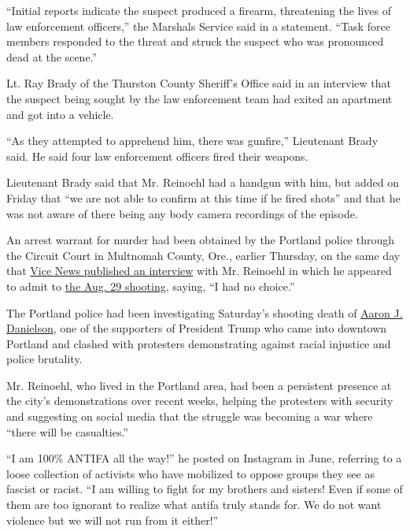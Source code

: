 ``Initial reports indicate the suspect produced a firearm, threatening
the lives of law enforcement officers,'' the Marshals Service said in a
statement. ``Task force members responded to the threat and struck the
suspect who was pronounced dead at the scene.''

Lt. Ray Brady of the Thurston County Sheriff's Office said in an
interview that the suspect being sought by the law enforcement team had
exited an apartment and got into a vehicle.

``As they attempted to apprehend him, there was gunfire,'' Lieutenant
Brady said. He said four law enforcement officers fired their weapons.

Lieutenant Brady said that Mr. Reinoehl had a handgun with him, but
added on Friday that ``we are not able to confirm at this time if he
fired shots'' and that he was not aware of there being any body camera
recordings of the episode.

An arrest warrant for murder had been obtained by the Portland police
through the Circuit Court in Multnomah County, Ore., earlier Thursday,
on the same day that
\href{https://www.vice.com/en_us/article/v7g8vb/man-linked-to-killing-at-a-portland-protest-says-he-acted-in-self-defense}{Vice
News published an interview} with Mr. Reinoehl in which he appeared to
admit to
\href{https://www.nytimes3xbfgragh.onion/2020/08/30/us/portland-trump-rally-shooting.html}{the
Aug. 29 shooting}, saying, ``I had no choice.''

The Portland police had been investigating Saturday's shooting death of
\href{https://www.nytimes3xbfgragh.onion/2020/08/30/us/portland-trump-rally-shooting.html}{Aaron
J. Danielson}, one of the supporters of President Trump who came into
downtown Portland and clashed with protesters demonstrating against
racial injustice and police brutality.

Mr. Reinoehl, who lived in the Portland area, had been a persistent
presence at the city's demonstrations over recent weeks, helping the
protesters with security and suggesting on social media that the
struggle was becoming a war where ``there will be casualties.''

``I am 100\% ANTIFA all the way!'' he posted on Instagram in June,
referring to a loose collection of activists who have mobilized to
oppose groups they see as fascist or racist. ``I am willing to fight for
my brothers and sisters! Even if some of them are too ignorant to
realize what antifa truly stands for. We do not want violence but we
will not run from it either!''

